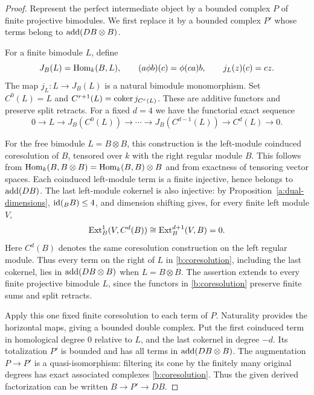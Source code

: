 \begin{proof}
Represent the perfect intermediate object by a bounded complex
\(P\) of finite projective bimodules.  We first replace it by a
bounded complex \(P'\) whose terms belong to \(\operatorname{add}(DB\otimes B)\).

For a finite bimodule \(L\), define
\[
 J_B(L)=\operatorname{Hom}_k(B,L),\qquad
 (a\phi b)(c)=\phi(ca)b,\qquad
 j_L(z)(c)=cz.
\]
The map \(j_L:L\to J_B(L)\) is a natural bimodule monomorphism.
Set \(C^0(L)=L\) and
\(C^{r+1}(L)=\operatorname{coker} j_{C^r(L)}\).  These are additive functors
and preserve split retracts.  For a fixed \(d=4\) we have the
functorial exact sequence
\begin{equation}\label{b:coresolution}
 0\longrightarrow L\longrightarrow J_B(C^0(L))
 \longrightarrow\cdots\longrightarrow J_B(C^{d-1}(L))
 \longrightarrow C^d(L)\longrightarrow0.
\end{equation}

For the free bimodule \(L=B\otimes B\), this construction is the
left-module coinduced coresolution of \(B\), tensored over \(k\)
with the right regular module \(B\).  This follows from
\(\operatorname{Hom}_k(B,B\otimes B)=\operatorname{Hom}_k(B,B)\otimes B\) and from exactness
of tensoring vector spaces.  Each coinduced left-module term is
a finite injective, hence belongs to \(\operatorname{add}(DB)\).
The last left-module cokernel is also injective: by
Proposition~\ref{a:dual-dimensions}, \(\operatorname{id}({}_BB)\leq4\), and
dimension shifting gives, for every finite left module \(V\),
\[
 \operatorname{Ext}_B^1(V,C^d(B))
 \cong\operatorname{Ext}_B^{d+1}(V,B)=0.
\]
Here \(C^d(B)\) denotes the same coresolution construction on the
left regular module.  Thus every term on the right of \(L\) in
\eqref{b:coresolution}, including the last cokernel, lies in
\(\operatorname{add}(DB\otimes B)\) when \(L=B\otimes B\).
The assertion extends to every finite projective bimodule
\(L\), since the functors in \eqref{b:coresolution} preserve finite
sums and split retracts.

Apply this one fixed finite coresolution to each term of \(P\).
Naturality provides the horizontal maps, giving a bounded double
complex.  Put the first coinduced term in homological degree \(0\)
relative to \(L\), and the last cokernel in degree \(-d\).
Its totalization \(P'\) is bounded and has all terms in
\(\operatorname{add}(DB\otimes B)\).  The augmentation \(P\to P'\) is a
quasi-isomorphism: filtering its cone by the finitely many original
degrees has exact associated complexes
\eqref{b:coresolution}.  Thus the given derived factorization can
be written \(B\to P'\to DB\).


\end{proof}
